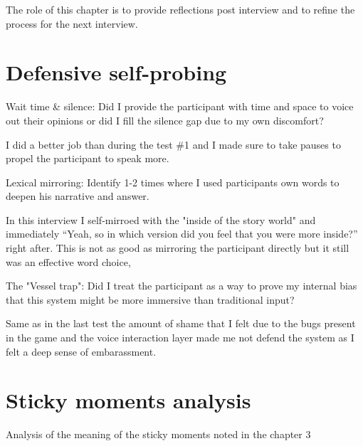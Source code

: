 
The role of this chapter is to provide reflections post interview and to refine the process for the next interview.

\section{Defensive self-probing}

\begin{QandA}
   \item Wait time \& silence: Did I provide the participant with time and space to voice out their opinions or did I fill the silence gap due to my own discomfort?
        \begin{answered}
        I did a better job than during the test \#1 and I made sure to take pauses to propel the participant to speak more.
        \end{answered}

   \item Lexical mirroring: Identify 1-2 times where I used participants own words to deepen his narrative and answer.

        \begin{answered}
        In this interview I self-mirroed with the "inside of the story world" and immediately “Yeah, so in which version did you feel that you were more inside?” right after. This is not as good as mirroring the participant directly but it still was an effective word choice,
        \end{answered}

    \item The "Vessel trap": Did I treat the participant as a way to prove my internal bias that this system might be more immersive than traditional input?

        \begin{answered}
        Same as in the last test the amount of shame that I felt due to the bugs present in the game and the voice interaction layer made me not defend the system as I felt a deep sense of embarassment. 
        \end{answered}
\end{QandA}

\section{Sticky moments analysis}
Analysis of the meaning of the sticky moments noted in the chapter 3


